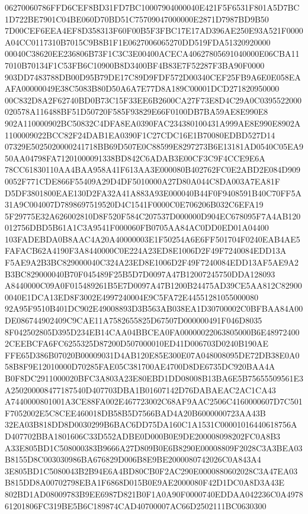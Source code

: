 \documentclass[UTF8,fontset=fandol,zihao=-4,a4paper]{ctexart}
\begin{document}
{{06270060786FFD6CEF8BD31FD7BC10007904000040E421F5F6531F801A5D7BC1D722BE7901C04BE060D70BD51C75709047000000E2871D7987BD9B50
7D00CEF6EEA4EF8D358313F60F00B5F3FBC17E17AD396AE250E93A521F0000A04CC0117310B7015C9B8B1F1E0627006065270DD519FDA51320920000
00040C38620EE236806B73F1C3C3E00400ACECA40627805691040000E06CBA117010B70134F1C53FB6C10900B8D3400BF4B83E7F52287F3BA90F0000
903DD7483788DB00D95B79DE17C89D9FDF572D00340CEF25FB9A6E0E058EAAFA00000049E38C5083B80D50A6A7E77D8A189C00001DCD271820950000
00C832D8A2F62740BD0B73C15F33EE6B2600CA27F73E8D4C29A0C0395522000020578A116488BF51D50720F585F93829E66F0100DB7BA59AE8E990E8
902A110000902BC50832C4DFA8EA0390FAC234380100431A999AE8E990E8902A1100009022BCC82F24DAB1EA0390F1C27CDC16E1B70080EDBD527D14
07329E5025020000241718BB69D507E0C88599E8297273B6E13181AD0540C05EA950AA04798FA71201000091338BD842C6ADAB3E00CF3C9F4CCE9E6A
78CC61830110AA4BAA958A41F613AA3E000080B402762FC0E2ABD2E084D9090052F771CDE866F55409A29D4DF5010000A27D80A044C8DA003A7EA81F
D5DF3801800EAE130D2FA32A41A883A93E000040B44F0F9408591B40C70FF5A31A9C004007D7898697519520D4C1541F0000C0E706206B032C6EFA19
5F29775E32A626002810D8F520F584C207537D000000D904EC678095F7A4AB120012756DBD5B61A1C3A9541F000060FB0705AA84AC0DD0ED01A04400
103FADEBDA0B8AAC4A20A40000003E1F50254A6E6FF501704F0240EAB4AE5FAFACB62A4190F3A8440000C0E224A23ED8E1006D2F49F7240084EDD13A
F5AE9A2B3BC829000040C324A23ED8E1006D2F49F7240084EDD13AF5AE9A2B3BC829000040B70F045489F25B5D7D0097A47B12007245750DDA128093
A8440000C09A0F015489261B5E7D0097A47B1200B24475AD39CE5AA812C829000040E1DCA13ED8F3002E4997240004E9C5FA72E44551281055000080
92A95F9510B401DC902E49008893D3B563AB038EA1D30700002C0BFBAA84A00DE086744902409C9CAE11A7582655825D67507D000000491F046D8035
8F042502805D395D234EB14CAA04BBCEA0FA00000022063805000B6E489724002CEEBCFA6FC6255325D87200D507000010ED41D006703D0240B190AE
FFE65D386B07020B00009031D4AB120E85E300E07A048008095DE72DB38E0A058B8F9E12010000D70285FAE05C381700AE4700D8DE6735DC920BAA4A
B0F8DC2911000020BFC3A803A23E80EBD1DD08008B13BA6E5B75655509561E3A250200008477187540D407703DBA1B01607142D76DABAEAC2AC1CA43
A7440000801001A3CE88FA002E467723002C68AF9AAC2506C4160000607D7C501F7052002E5C8CEE460018DB58B5D7566BAD4A20B6000000723AA43B
32EA03B818DD8D0030299B6BAC6DD75DA160C1A1531C00001016440618756AD407702BBA1801606C33D552ADBE0D000B0E9DE200008098202FC0A8B3
A33E805BD1C508000383B9666A27D809B0E6B8290E00008809F2028C3A3BEA03B8155D8C003030986BA676829D006B8E9BE2000080742026C0A843A4
3E805BD1C5080043B2B94E6A4BD80CB0F2AC290E0000880602028C3A47EA03B815DD8A00702798EBA1F6868D015B0E9AE2000080F42D1DC0A8D3A43E
802BD1AD08009783B9EE6987D821B0F1A0A90F0000740EDDAA042236C0A497861201806FC319BE5B6C189874CAD40700007AC66D2502111BC0630300
}}
\end{document}
